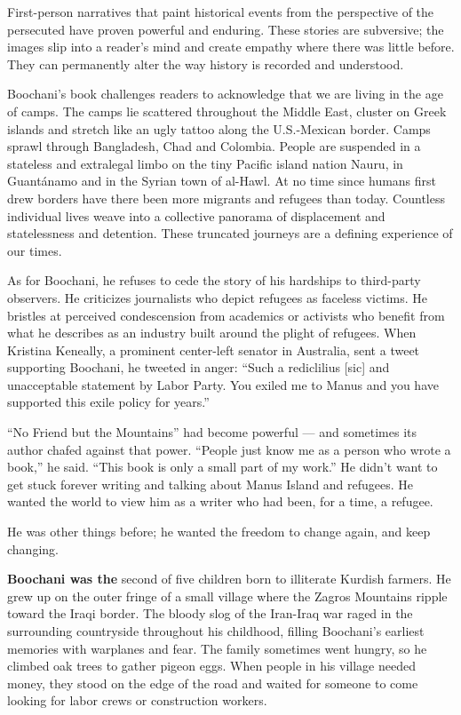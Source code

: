 First-person narratives that paint historical events from the
perspective of the persecuted have proven powerful and enduring. These
stories are subversive; the images slip into a reader's mind and create
empathy where there was little before. They can permanently alter the
way history is recorded and understood.

Boochani's book challenges readers to acknowledge that we are living in
the age of camps. The camps lie scattered throughout the Middle East,
cluster on Greek islands and stretch like an ugly tattoo along the
U.S.-Mexican border. Camps sprawl through Bangladesh, Chad and Colombia.
People are suspended in a stateless and extralegal limbo on the tiny
Pacific island nation Nauru, in Guantánamo and in the Syrian town of
al-Hawl. At no time since humans first drew borders have there been more
migrants and refugees than today. Countless individual lives weave into
a collective panorama of displacement and statelessness and detention.
These truncated journeys are a defining experience of our times.

As for Boochani, he refuses to cede the story of his hardships to
third-party observers. He criticizes journalists who depict refugees as
faceless victims. He bristles at perceived condescension from academics
or activists who benefit from what he describes as an industry built
around the plight of refugees. When Kristina Keneally, a prominent
center-left senator in Australia, sent a tweet supporting Boochani, he
tweeted in anger: ``Such a rediclilius {[}sic{]} and unacceptable
statement by Labor Party. You exiled me to Manus and you have supported
this exile policy for years.''

``No Friend but the Mountains'' had become powerful --- and sometimes
its author chafed against that power. ``People just know me as a person
who wrote a book,'' he said. ``This book is only a small part of my
work.'' He didn't want to get stuck forever writing and talking about
Manus Island and refugees. He wanted the world to view him as a writer
who had been, for a time, a refugee.

He was other things before; he wanted the freedom to change again, and
keep changing.

\textbf{Boochani was the} second of five children born to illiterate
Kurdish farmers. He grew up on the outer fringe of a small village where
the Zagros Mountains ripple toward the Iraqi border. The bloody slog of
the Iran-Iraq war raged in the surrounding countryside throughout his
childhood, filling Boochani's earliest memories with warplanes and fear.
The family sometimes went hungry, so he climbed oak trees to gather
pigeon eggs. When people in his village needed money, they stood on the
edge of the road and waited for someone to come looking for labor crews
or construction workers.

